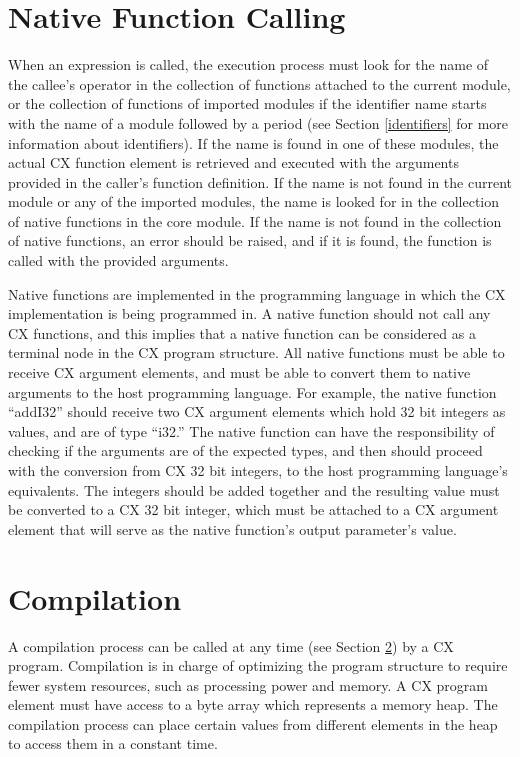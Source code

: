 \section{Native Function Calling}
\label{native-function-calling}

When an expression is called, the execution process must look for the
name of the callee's operator in the collection of functions attached
to the current module, or the collection of functions of imported
modules if the identifier name starts with the name of a module
followed by a period (see Section \ref{identifiers} for more
information about identifiers). If the name is found in one of these
modules, the actual CX function element is retrieved and executed with
the arguments provided in the caller's function definition. If the
name is not found in the current module or any of the imported
modules, the name is looked for in the collection of native functions
in the core module. If the name is not found in the collection of native
functions, an error should be raised, and if it is found, the function
is called with the provided arguments.

Native functions are implemented in the programming language in which
the CX implementation is being programmed in. A native function should
not call any CX functions, and this implies that a native function
can be considered as a terminal node in the CX program
structure. All native functions must be able to receive CX argument
elements, and must be able to convert them to
native arguments to the host programming language. For example, the
native function ``addI32'' should receive two CX argument elements
which hold 32 bit integers as values, and are of type ``i32.'' The
native function can have the responsibility of checking if the
arguments are of the expected types, and then should proceed with the
conversion from CX 32 bit integers, to the host programming language's
equivalents. The integers should be added together and the resulting
value must be converted to a CX 32 bit integer, which must be attached
to a CX argument element that will serve as the native function's
output parameter's value.

\section{Compilation}
\label{compilation}

A compilation process can be called at any time (see Section
\ref{compilation}) by a CX program. Compilation is in charge of
optimizing the program structure to require fewer system resources, such as
processing power and memory. A CX program element must have access to
a byte array which represents a memory heap. The compilation process
can place certain values from different elements in the heap to access
them in a constant time.
